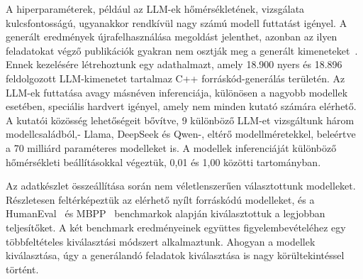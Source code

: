 \documentclass[12pt,a4paper]{extarticle}
\begin{document}
A hiperparaméterek, például az LLM-ek hőmérsékletének, vizsgálata kulcsfontosságú, u\-gyan\-ak\-kor rendkívül nagy számú modell futtatást igényel.
A generált eredmények új\-ra\-fel\-hasz\-ná\-lá\-sa megoldást jelenthet, azonban az ilyen feladatokat végző publikációk gyakran nem osztják meg a generált kimeneteket~\cite{data_no_share_1,data_no_share_2,data_no_share_3,data_no_share_4,data_no_share_5}.
Ennek kezelésére lét\-re\-hoz\-tunk egy adathalmazt, amely 18.900 nyers és 18.896 feldolgozott LLM-kimenetet tartalmaz C++ forráskód-generálás területén.
Az LLM-ek futtatása avagy másnéven inferenciája, különösen a nagyobb modellek esetében, speciális hardvert igényel, amely nem minden kutató számára elérhető.
A kutatói közösség lehetőségeit bővítve, 9 különböző LLM-et vizsgáltunk három modellcsaládból,- Llama, DeepSeek és Qwen-, eltérő mo\-dell\-mé\-re\-tek\-kel, beleértve a 70 milliárd paraméteres modelleket is.
A modellek inferenciáját különböző hőmérsékleti beállításokkal végeztük, 0,01 és 1,00 közötti tartományban.

Az adatkészlet összeállítása során nem véletlenszerűen választottunk modelleket.
Rész\-le\-te\-sen feltérképeztük az elérhető nyílt forráskódú modelleket, és a HumanEval~\cite{codex} és MBPP~\cite{mbpp} benchmarkok alapján kiválasztottuk a legjobban teljesítőket.
A két benchmark eredményeinek együttes figyelembevételéhez egy többfeltételes kiválasztási módszert alkalmaztunk.
Ahogyan a modellek kiválasztása, úgy a generálandó feladatok kiválasztása is nagy körültekintéssel történt.
\end{document}
